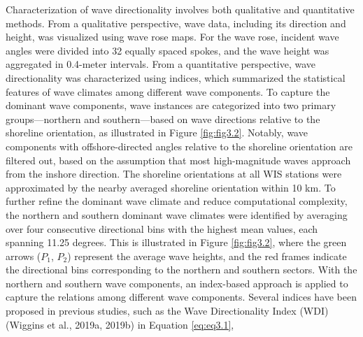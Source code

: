 Characterization of wave directionality involves both qualitative and quantitative methods. From a qualitative perspective, wave data, including its direction and height, was visualized using wave rose maps. For the wave rose, incident wave angles were divided into 32 equally spaced spokes, and the wave height was aggregated in 0.4-meter intervals. From a quantitative perspective, wave directionality was characterized using indices, which summarized the statistical features of wave climates among different wave components. To capture the dominant wave components, wave instances are categorized into two primary groups—northern and southern—based on wave directions relative to the shoreline orientation, as illustrated in Figure \ref{fig:fig3.2}. Notably, wave components with offshore-directed angles relative to the shoreline orientation are filtered out, based on the assumption that most high-magnitude waves approach from the inshore direction. The shoreline orientations at all WIS stations were approximated by the nearby averaged shoreline orientation within 10 km. To further refine the dominant wave climate and reduce computational complexity, the northern and southern dominant wave climates were identified by averaging over four consecutive directional bins with the highest mean values, each spanning 11.25 degrees. This is illustrated in Figure \ref{fig:fig3.2}, where the green arrows ($P_1$, $P_2$) represent the average wave heights, and the red frames indicate the directional bins corresponding to the northern and southern sectors. With the northern and southern wave components, an index-based approach is applied to capture the relations among different wave components. Several indices have been proposed in previous studies, such as the Wave Directionality Index (WDI) (Wiggins et al., 2019a, 2019b) in Equation \ref{eq:eq3.1},

